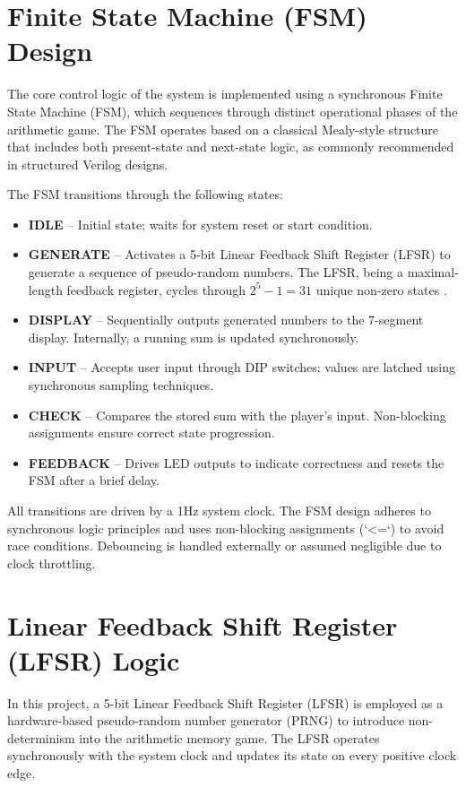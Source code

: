 \documentclass[10pt,a4paper,twocolumn,twoside]{tau-class/tau}
\begin{document}
		
\section{Finite State Machine (FSM) Design}

The core control logic of the system is implemented using a synchronous Finite State Machine (FSM), which sequences through distinct operational phases of the arithmetic game. The FSM operates based on a classical Mealy-style structure that includes both present-state and next-state logic, as commonly recommended in structured Verilog designs. 

The FSM transitions through the following states:

\begin{itemize}
    \item \textbf{IDLE} – Initial state; waits for system reset or start condition.
    \item \textbf{GENERATE} – Activates a 5-bit Linear Feedback Shift Register (LFSR) to generate a sequence of pseudo-random numbers. The LFSR, being a maximal-length feedback register, cycles through $2^5 - 1 = 31$ unique non-zero states \cite{nandland_lfsr}.
    \item \textbf{DISPLAY} – Sequentially outputs generated numbers to the 7-segment display. Internally, a running sum is updated synchronously.
    \item \textbf{INPUT} – Accepts user input through DIP switches; values are latched using synchronous sampling techniques.
    \item \textbf{CHECK} – Compares the stored sum with the player’s input. Non-blocking assignments ensure correct state progression.
    \item \textbf{FEEDBACK} – Drives LED outputs to indicate correctness and resets the FSM after a brief delay.
\end{itemize}

All transitions are driven by a 1Hz system clock. The FSM design adheres to synchronous logic principles and uses non-blocking assignments (`<=`) to avoid race conditions. Debouncing is handled externally or assumed negligible due to clock throttling.



\section{Linear Feedback Shift Register (LFSR) Logic}

In this project, a 5-bit Linear Feedback Shift Register (LFSR) is employed as a hardware-based pseudo-random number generator (PRNG) to introduce non-determinism into the arithmetic memory game. The LFSR operates synchronously with the system clock and updates its state on every positive clock edge.
\end{document}
